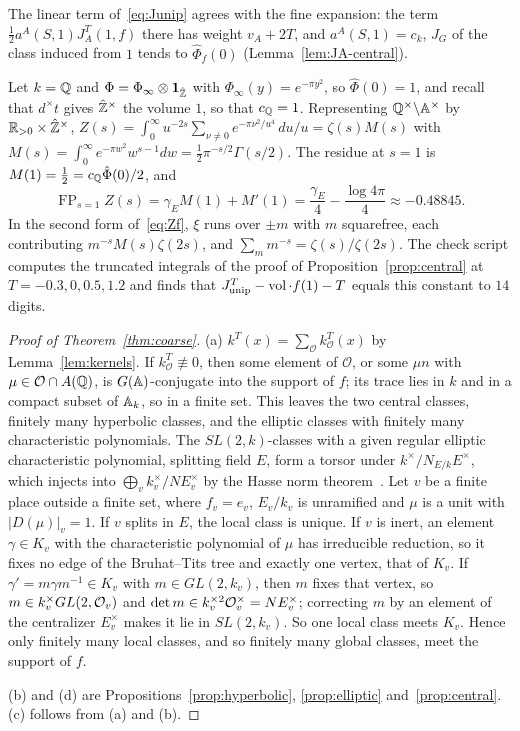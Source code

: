 The linear term of~\eqref{eq:Junip} agrees with the fine expansion: the
term $\tfrac12a^A(S,1)J^T_A(1,f)$ there has weight $v_A+2T$, and
$a^A(S,1)=c_k$, $J_G$ of the class induced from $1$ tends to
$\hat\Phi_f(0)$ (Lemma~\ref{lem:JA-central}).

\begin{example}\label{ex:unip-Q}
Let $k=\mathbb{Q}$ and $\Phi=\Phi_\infty\otimes\mathbf 1_{\hat{\mathbb{Z}}}$ with
$\Phi_\infty(y)=e^{-\pi y^2}$, so $\hat\Phi(0)=1$, and recall that $d^\times t$
gives $\hat{\mathbb{Z}}^\times$ the volume $1$, so that $c_{\mathbb{Q}}=1$. Representing
$\mathbb{Q}^\times\backslash\mathbb{A}^\times$ by $\mathbb{R}_{>0}\times\hat{\mathbb{Z}}^\times$,
$Z(s)=\int_0^\infty u^{-2s}\sum_{\nu\ne0}e^{-\pi\nu^2/u^4}\,du/u=
\zeta(s)M(s)$ with $M(s)=\int_0^\infty e^{-\pi w^2}w^{s-1}dw=
\tfrac12\pi^{-s/2}\Gamma(s/2)$. The residue at $s=1$ is $M(1)=\tfrac12=
c_{\mathbb{Q}}\hat\Phi(0)/2$, and
\[
\mathop{\mathrm{FP}}_{s=1}Z(s)=\gamma_EM(1)+M'(1)
=\frac{\gamma_E}4-\frac{\log4\pi}4\approx-0.48845 .
\]
In the second form of~\eqref{eq:Zf}, $\xi$ runs over $\pm m$ with $m$
squarefree, each contributing $m^{-s}M(s)\zeta(2s)$, and
$\sum_m m^{-s}=\zeta(s)/\zeta(2s)$. The check script computes the
truncated integrals of the proof of Proposition~\ref{prop:central} at
$T=-0.3,0,0.5,1.2$ and finds that
$J^T_{\mathrm{unip}}-\operatorname{vol}\cdot f(1)-T$ equals this constant to
$14$ digits.
\end{example}

\begin{proof}[Proof of Theorem~\ref{thm:coarse}]
(a) $k^T(x)=\sum_{\mathcal O}k^T_{\mathcal O}(x)$ by
Lemma~\ref{lem:kernels}. If $k^T_{\mathcal O}\not\equiv0$, then some
element of $\mathcal O$, or some $\mu n$ with $\mu\in\mathcal O\cap A(\mathbb{Q})$,
is $G(\mathbb{A})$-conjugate into the support of $f$; its trace lies in $k$ and
in a compact subset of $\mathbb{A}_k$, so in a finite set. This leaves the two
central classes, finitely many hyperbolic classes, and the elliptic
classes with finitely many characteristic polynomials. The
$SL(2,k)$-classes with a given regular elliptic characteristic polynomial,
splitting field $E$, form a torsor under $k^\times/N_{E/k}E^\times$,
which injects into $\bigoplus_vk_v^\times/N E_v^\times$ by the Hasse
norm theorem~\cite{CF67}. Let $v$ be a finite place outside a finite set,
where $f_v=e_v$, $E_v/k_v$ is unramified and $\mu$ is a unit with
$|D(\mu)|_v=1$. If $v$ splits in $E$, the local class is unique. If $v$
is inert, an element $\gamma\in K_v$ with the characteristic polynomial
of $\mu$ has irreducible reduction, so it fixes no edge of the
Bruhat--Tits tree and exactly one vertex, that of $K_v$. If $\gamma'=
m\gamma m^{-1}\in K_v$ with $m\in GL(2,k_v)$, then $m$ fixes that vertex,
so $m\in k_v^\times GL(2,\mathcal{O}_v)$ and $\det m\in k_v^{\times2}\mathcal{O}_v^\times
=N E_v^\times$; correcting $m$ by an element of the centralizer $E_v^\times$
makes it lie in $SL(2,k_v)$. So one local class meets $K_v$. Hence only
finitely many local classes, and so finitely many global classes, meet the
support of $f$.

(b) and (d) are Propositions~\ref{prop:hyperbolic}, \ref{prop:elliptic}
and~\ref{prop:central}. (c) follows from (a) and (b).
\end{proof}

